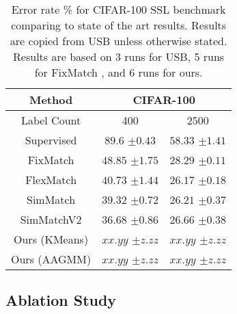 \documentclass[10pt,twocolumn,letterpaper]{article}
\begin{document}
\begin{table}[htbp]
	\begin{tabular}{c|cc}
		Method            & \multicolumn{2}{c}{CIFAR-100} \\ 
		\hline
		Label Count           & 400           & 2500          \\
		Supervised   & $89.6$ \scriptsize{$\pm0.43$}    & $58.33$ \scriptsize{$\pm1.41$}   \\ \hline
		FixMatch      & $48.85$ \scriptsize{$\pm1.75$}   & $28.29$ \scriptsize{$\pm0.11$}   \\
		FlexMatch   & $40.73$ \scriptsize{$\pm1.44$}   & $26.17$ \scriptsize{$\pm0.18$}   \\
		SimMatch    & $39.32$ \scriptsize{$\pm0.72$}   & $26.21$ \scriptsize{$\pm0.37$}   \\
		SimMatchV2    & $36.68$ \scriptsize{$\pm0.86$}   & $26.66$ \scriptsize{$\pm0.38$}   \\ \hline
		Ours (KMeans)    & $xx.yy$ \scriptsize{$\pm z.zz$}           & $xx.yy$ \scriptsize{$\pm z.zz$}  \\
		Ours (AAGMM)    & $xx.yy$ \scriptsize{$\pm z.zz$}           & $xx.yy$ \scriptsize{$\pm z.zz$}  
	\end{tabular}
	\caption{Error rate \% for CIFAR-100 SSL benchmark comparing to state of the art results. Results are copied from USB \cite{wang2022usb} unless otherwise stated. Results are based on 3 runs for USB, 5 runs for FixMatch \cite{sohn2020fixmatch}, and 6 runs for ours.}
	\label{table3}
\end{table}

\subsection{Ablation Study}
\end{document}
